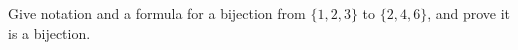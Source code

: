Give notation and a formula for a bijection from $\{1,2,3\}$ to $\{2,4,6\}$, and prove it is a bijection.
